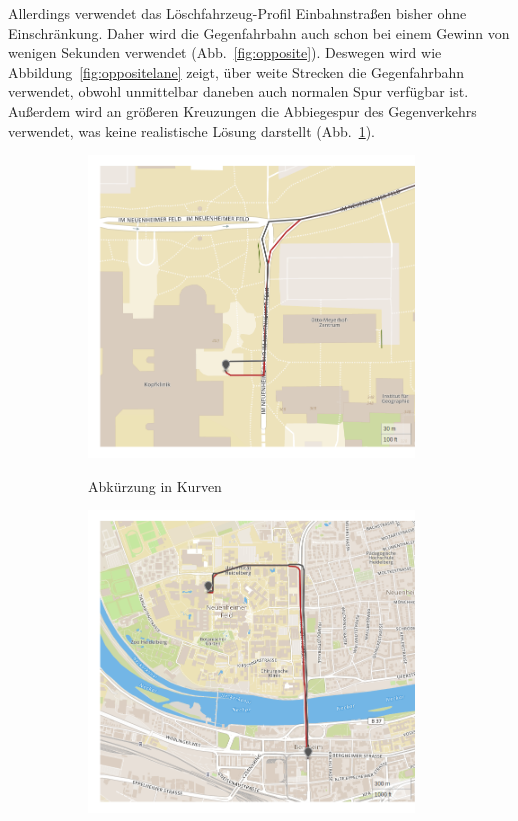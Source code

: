 Allerdings verwendet das Löschfahrzeug-Profil Einbahnstraßen bisher ohne Einschränkung.
Daher wird die Gegenfahrbahn auch schon bei einem Gewinn von wenigen Sekunden verwendet (Abb.~\ref{fig:opposite}).
Deswegen wird wie Abbildung~\ref{fig:oppositelane} zeigt, über weite Strecken die Gegenfahrbahn verwendet, obwohl unmittelbar daneben auch normalen Spur verfügbar ist.
Außerdem wird an größeren Kreuzungen die Abbiegespur des Gegenverkehrs verwendet, was keine realistische Lösung darstellt (Abb.~\ref{fig:oppositecurve}).


\begin{figure}[htb]
\centering
\begin{subfigure}{0.49\textwidth}
\centering
\includegraphics[width = 0.95\textwidth]{../media/oppositecurve.png} \\
\caption{Abkürzung in Kurven}
\label{fig:oppositecurve}
\end{subfigure}
\begin{subfigure}{0.49\textwidth}
\centering
\includegraphics[width = 0.95\textwidth]{../media/oppositelane.png} \\

\end{subfigure}
\end{figure}
